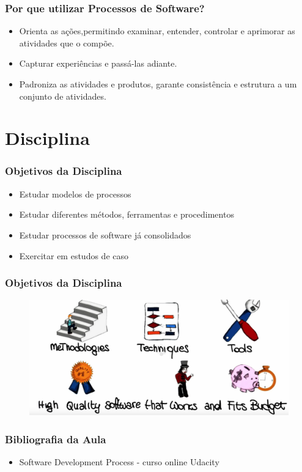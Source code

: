  \begin{frame}
  \frametitle{Por que utilizar Processos de Software?}
  \begin{itemize}
   \item Orienta as ações,permitindo examinar, entender, controlar e aprimorar as atividades
que o compõe.
\item Capturar experiências e passá-las adiante. 
\item  Padroniza as atividades e produtos, garante consistência e estrutura a um conjunto de
atividades.
  \end{itemize}
 \end{frame}

 \section{Disciplina}
\begin{frame}
 \frametitle{Objetivos da Disciplina}
 \begin{itemize}
  \item Estudar modelos de processos
  \item Estudar diferentes métodos, ferramentas e procedimentos
  \item Estudar processos de software já consolidados
  \item Exercitar em estudos de caso
 \end{itemize}
\end{frame}

\begin{frame}
 \frametitle{Objetivos da Disciplina}
 \begin{figure}
  \includegraphics[width = \textwidth]{figs/fig5.png}
 \end{figure}

\end{frame}



\begin{frame}
\frametitle{Bibliografia da Aula}
\begin{itemize}
 \item Software Development Process - curso online  Udacity 

\end{itemize}
\end{frame}


